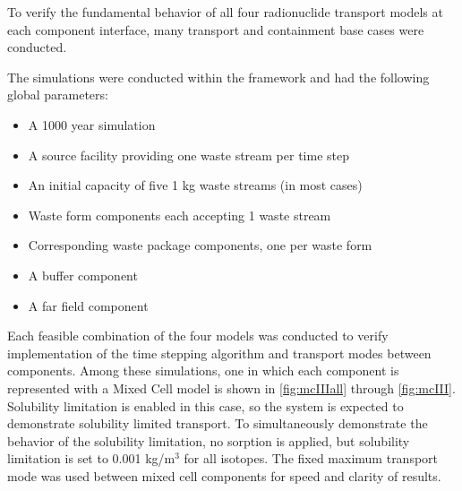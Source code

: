 
To verify the fundamental behavior of all four \Cyder radionuclide transport models at
each component interface, many transport and containment base cases were
conducted.

The simulations were conducted within the \Cyclus framework and had the
following global parameters:

\begin{itemize}
\item{A 1000 year simulation}
\item{A source facility providing one waste stream per time step}
\item{An initial capacity of five 1 kg waste streams (in most cases)}
\item{Waste form components each accepting 1 waste stream}
\item{Corresponding waste package components, one per waste form}
\item{A buffer component}
\item{A far field component}
\end{itemize}


Each feasible combination of the four models was conducted to verify
implementation of the time stepping algorithm and transport modes between
components. Among these simulations, one in which each component is represented with a Mixed
Cell model is shown in \ref{fig:mcIIIall} through \ref{fig:mcIII}.  Solubility
limitation is enabled in this case, so the system is expected to demonstrate
solubility limited transport.  To simultaneously demonstrate the behavior of
the solubility limitation, no sorption is applied, but solubility limitation is
set to 0.001 kg/m$^3$ for all isotopes.  The fixed maximum transport mode was
used between mixed cell components for speed and clarity of results.



\FloatBarrier

